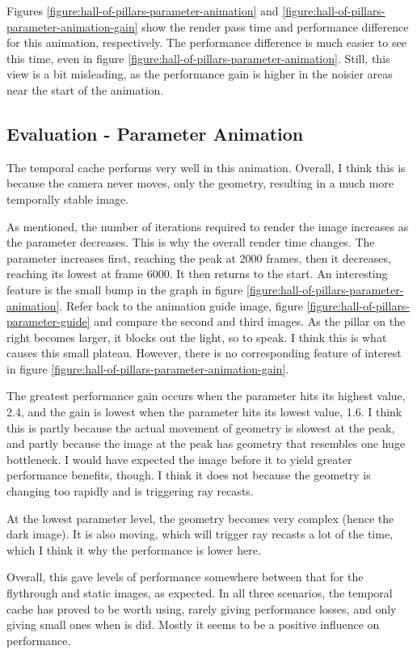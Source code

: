 Figures \ref{figure:hall-of-pillars-parameter-animation} and \ref{figure:hall-of-pillars-parameter-animation-gain} show the render pass time and performance difference for this animation, respectively. The performance difference is much easier to see this time, even in figure \ref{figure:hall-of-pillars-parameter-animation}. Still, this view is a bit misleading, as the performance gain is higher in the noisier areas near the start of the animation.

\subsection{Evaluation - Parameter Animation}

The temporal cache performs very well in this animation. Overall, I think this is because the camera never moves, only the geometry, resulting in a much more temporally stable image.\newline

As mentioned, the number of iterations required to render the image increases as the parameter decreases. This is why the overall render time changes. The parameter increases first, reaching the peak at 2000 frames, then it decreases, reaching its lowest at frame 6000. It then returns to the start. An interesting feature is the small bump in the graph in figure \ref{figure:hall-of-pillars-parameter-animation}. Refer back to the animation guide image, figure \ref{figure:hall-of-pillars-parameter-guide} and compare the second and third images. As the pillar on the right becomes larger, it blocks out the light, so to speak. I think this is what causes this small plateau. However, there is no corresponding feature of interest in figure \ref{figure:hall-of-pillars-parameter-animation-gain}.\newline

The greatest performance gain occurs when the parameter hits its highest value, 2.4, and the gain is lowest when the parameter hits its lowest value, 1.6. I think this is partly because the actual movement of geometry is slowest at the peak, and partly because the image at the peak has geometry that resembles one huge bottleneck. I would have expected the image before it to yield greater performance benefits, though. I think it does not because the geometry is changing too rapidly and is triggering ray recasts.\newline

At the lowest parameter level, the geometry becomes very complex (hence the dark image). It is also moving, which will trigger ray recasts a lot of the time, which I think it why the performance is lower here.\newline

Overall, this gave levels of performance somewhere between that for the flythrough and static images, as expected. In all three scenarios, the temporal cache has proved to be worth using, rarely giving performance losses, and only giving small ones when is did. Mostly it seems to be a positive influence on performance.